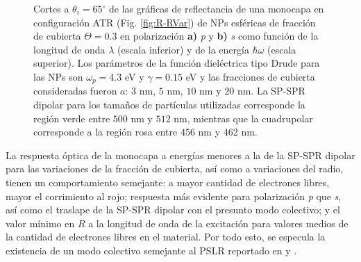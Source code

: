 \begin{figure}[h!]
	\caption{Cortes a $\theta_i = 65^\circ$ de las gráficas de reflectancia de una monocapa en configuración ATR (Fig. \ref{fig:R-RVar}) de NPs esféricas de fracción de cubierta $\Theta = 0.3$ en polarización \textbf{a)} \emph{p} y \textbf{b)} \emph{s} como función de la longitud de onda $\lambda$ (escala inferior) y de la energía $\hbar\omega$ (escala superior). Los parámetros de la función dieléctrica tipo Drude para las NPs son $\omega_p = 4.3$ eV y $\gamma = 0.15$ eV y las fracciones de cubierta consideradas fueron $a$: $3$ nm, $5$ nm, $10$ nm y $20$ nm. La SP-SPR dipolar para los tamaños de partículas utilizadas corresponde la región verde entre $500$ nm y $512$ nm, mientras que la cuadrupolar corresponde a la región rosa entre $456$ nm y $462$ nm.}\label{fig:R-RVar-Cuts}
	\end{figure}	

La respuesta óptica de la monocapa a energías menores a la de la SP-SPR dipolar para las variaciones de la fracción de cubierta, así como a variaciones del radio, tienen un comportamiento semejante: a mayor cantidad de electrones libres, mayor el corrimiento al rojo; respuesta más evidente para polarización \emph{p} que \emph{s}, así como el traslape  de la SP-SPR dipolar con el presunto modo colectivo; y el valor mínimo en $R$ a la longitud de onda de la excitación para valores medios de la cantidad de electrones libres en el material. Por todo esto, se especula la existencia de un modo colectivo semejante al PSLR reportado en  \cite{kabashin2009plasmonic} y \cite{danilov2018ultra}. 

